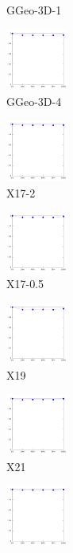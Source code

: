 \documentclass[a4paper,10pt]{article}
\begin{document}
\begin{figure}[ht]
{\begin{subfigure}[b]{2.5cm}
\caption{GGeo-3D-1}
\end{subfigure} 
\begin{subfigure}[b]{2.5cm}
\centering
\includegraphics[height=2cm]{allcat_GGeo-3D-4.pdf}
\caption{GGeo-3D-4}
\end{subfigure} 
\begin{subfigure}[b]{2.5cm}
\centering
\includegraphics[height=2cm]{allcat_X17-2.pdf}
\caption{X17-2}
\end{subfigure} 
\begin{subfigure}[b]{2.5cm}
\centering
\includegraphics[height=2cm]{allcat_X17-0_5.pdf}
\caption{X17-0.5}
\end{subfigure} 
\begin{subfigure}[b]{2.5cm}
\centering
\includegraphics[height=2cm]{allcat_X19.pdf}
\caption{X19}
\end{subfigure} 
\begin{subfigure}[b]{2.5cm}
\centering
\includegraphics[height=2cm]{allcat_X21.pdf}
\caption{X21}
\end{subfigure} 
\begin{subfigure}[b]{2.5cm}
\centering
\includegraphics[height=2cm]{allcat_CC.pdf}

\end{subfigure}}
\end{figure}
\end{document}
